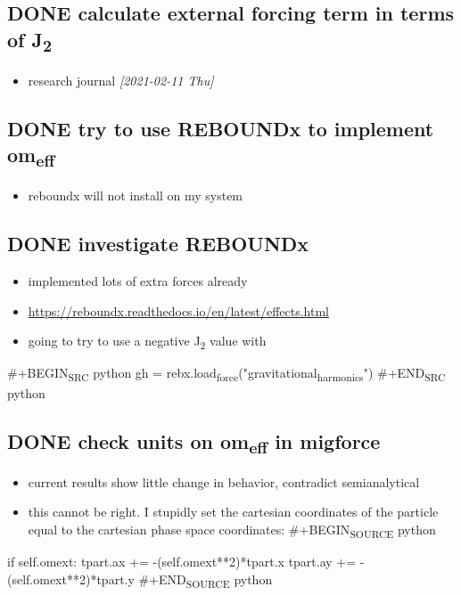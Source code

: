 \documentclass[11pt]{article}
\begin{document}
\subsection{{\bfseries\sffamily DONE} calculate external forcing term in terms of J\textsubscript{2}}
\label{sec:org2cc83a4}
\begin{itemize}
\item research journal \textit{[2021-02-11 Thu]}
\end{itemize}
\subsection{{\bfseries\sffamily DONE} try to use REBOUNDx to implement om\textsubscript{eff}}
\label{sec:org31a551e}
\begin{itemize}
\item reboundx will not install on my system
\end{itemize}
\subsection{{\bfseries\sffamily DONE} investigate REBOUNDx}
\label{sec:orgd0dc419}
\begin{itemize}
\item implemented lots of extra forces already
\item \url{https://reboundx.readthedocs.io/en/latest/effects.html}
\item going to try to use a negative J\textsubscript{2} value with
\end{itemize}
\#+BEGIN\textsubscript{SRC} python
gh = rebx.load\textsubscript{force}("gravitational\textsubscript{harmonics}")
\#+END\textsubscript{SRC} python
\subsection{{\bfseries\sffamily DONE} check units on om\textsubscript{eff} in migforce}
\label{sec:orge5b9a11}
\begin{itemize}
\item current results show little change in behavior, contradict
semianalytical
\item this cannot be right. I stupidly set the cartesian coordinates of
the particle equal to the cartesian phase space coordinates:
\#+BEGIN\textsubscript{SOURCE} python
\end{itemize}
if self.omext:
    tpart.ax += -(self.omext**2)*tpart.x
    tpart.ay += -(self.omext**2)*tpart.y
  \#+END\textsubscript{SOURCE} python
\end{document}
